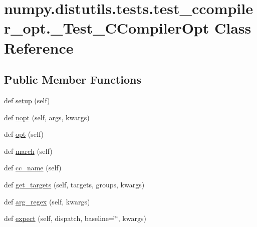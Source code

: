 \hypertarget{classnumpy_1_1distutils_1_1tests_1_1test__ccompiler__opt_1_1__Test__CCompilerOpt}{}\section{numpy.\+distutils.\+tests.\+test\+\_\+ccompiler\+\_\+opt.\+\_\+\+Test\+\_\+\+C\+Compiler\+Opt Class Reference}
\label{classnumpy_1_1distutils_1_1tests_1_1test__ccompiler__opt_1_1__Test__CCompilerOpt}
\subsection*{Public Member Functions}
\begin{DoxyCompactItemize}
\item 
def \hyperlink{classnumpy_1_1distutils_1_1tests_1_1test__ccompiler__opt_1_1__Test__CCompilerOpt_ac10d21556d5412b6bff2f386a3394246}{setup} (self)
\item 
def \hyperlink{classnumpy_1_1distutils_1_1tests_1_1test__ccompiler__opt_1_1__Test__CCompilerOpt_a5354cefca0b4157916a28b42c05b1340}{nopt} (self, args, kwargs)
\item 
def \hyperlink{classnumpy_1_1distutils_1_1tests_1_1test__ccompiler__opt_1_1__Test__CCompilerOpt_ab7e100dca68072814174ef66733ec073}{opt} (self)
\item 
def \hyperlink{classnumpy_1_1distutils_1_1tests_1_1test__ccompiler__opt_1_1__Test__CCompilerOpt_a93188bb2c14773ae13af2ab5d3319297}{march} (self)
\item 
def \hyperlink{classnumpy_1_1distutils_1_1tests_1_1test__ccompiler__opt_1_1__Test__CCompilerOpt_a1b5d581ad434c5db9fc6a70e5bfa48e2}{cc\+\_\+name} (self)
\item 
def \hyperlink{classnumpy_1_1distutils_1_1tests_1_1test__ccompiler__opt_1_1__Test__CCompilerOpt_adbe4b6c6f73f4bbe125ec64e1c78834d}{get\+\_\+targets} (self, targets, groups, kwargs)
\item 
def \hyperlink{classnumpy_1_1distutils_1_1tests_1_1test__ccompiler__opt_1_1__Test__CCompilerOpt_a59afcf457b4d3ee5fda03357f65d6ae7}{arg\+\_\+regex} (self, kwargs)
\item 
def \hyperlink{classnumpy_1_1distutils_1_1tests_1_1test__ccompiler__opt_1_1__Test__CCompilerOpt_a7d072c5f921acb06c76f86a8ac9915d3}{expect} (self, dispatch, baseline=\char`\"{}\char`\"{}, kwargs)
\item 

\end{DoxyCompactItemize}
